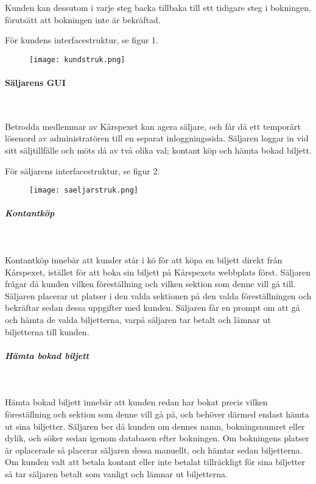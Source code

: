 \documentclass[a4paper, twoside, 11pt, titlepage]{article}
\begin{document}
			Kunden kan dessutom i varje steg backa tillbaka till ett tidigare steg i bokningen, förutsätt att bokningen inte är bekräftad. 

			För kundens interfacestruktur, se figur 1.

			\begin{figure}[ht] \centering \texttt{[image: kundstruk.png]} \end{figure} \FloatBarrier

			\paragraph{Säljarens GUI}\

			Betrodda medlemmar av Kårspexet kan agera säljare, och får då ett temporärt lösenord av administratören till en separat inloggningssida. Säljaren loggar in vid sitt säljtillfälle och möts då av två olika val; kontant köp och hämta bokad biljett.

			För säljarens interfacestruktur, se figur 2.

			\begin{figure}[ht] \centering \texttt{[image: saeljarstruk.png]} \end{figure} \FloatBarrier

			\subparagraph{\emph{Kontantköp}}\

				Kontantköp innebär att kunder står i kö för att köpa en biljett direkt från Kårspexet, istället för att boka sin biljett på Kårspexets webbplats först. Säljaren frågar då kunden vilken föreställning och vilken sektion som denne vill gå till. Säljaren placerar ut platser i den valda sektionen på den valda föreställningen och bekräftar sedan dessa uppgifter med kunden. Säljaren får en prompt om att gå och hämta de valda biljetterna, varpå säljaren tar betalt och lämnar ut biljetterna till kunden.

			\subparagraph{\emph{Hämta bokad biljett}}\

				Hämta bokad biljett innebär att kunden redan har bokat precis vilken föreställning och sektion som denne vill gå på, och behöver därmed endast hämta ut sina biljetter. Säljaren ber då kunden om dennes namn, bokningsnumret eller dylik, och söker sedan igenom databasen efter bokningen. Om bokningens platser är oplacerade så placerar säljaren dessa manuellt, och hämtar sedan biljetterna. Om kunden valt att betala kontant eller inte betalat tillräckligt för sina biljetter så tar säljaren betalt som vanligt och lämnar ut biljetterna.
\end{document}
